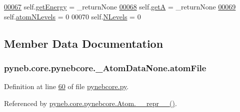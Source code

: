 \begin{DoxyCode}
\hypertarget{classpyneb_1_1core_1_1pynebcore_1_1___atom_data_none_l00067}{}\hyperlink{classpyneb_1_1core_1_1pynebcore_1_1___atom_data_none_a44aa15dc5314c07627944e86581631b1}{00067}         self.\hyperlink{classpyneb_1_1core_1_1pynebcore_1_1___atom_data_none_ace59c545d211f79753ebdc9414eb1824}{getEnergy} = \_returnNone
\hypertarget{classpyneb_1_1core_1_1pynebcore_1_1___atom_data_none_l00068}{}\hyperlink{classpyneb_1_1core_1_1pynebcore_1_1___atom_data_none_a3bc65b4742319ce5123d6fd3ca977c63}{00068}         self.\hyperlink{classpyneb_1_1core_1_1pynebcore_1_1___atom_data_none_a44aa15dc5314c07627944e86581631b1}{getA} = \_returnNone
\hypertarget{classpyneb_1_1core_1_1pynebcore_1_1___atom_data_none_l00069}{}\hyperlink{classpyneb_1_1core_1_1pynebcore_1_1___atom_data_none_a784a8906a9fd1b408b567989207aca84}{00069}         self.\hyperlink{classpyneb_1_1core_1_1pynebcore_1_1___atom_data_none_a3bc65b4742319ce5123d6fd3ca977c63}{atomNLevels} = 0
00070         self.\hyperlink{classpyneb_1_1core_1_1pynebcore_1_1___atom_data_none_a784a8906a9fd1b408b567989207aca84}{NLevels} = 0

\end{DoxyCode}


\subsection{Member Data Documentation}
\hypertarget{classpyneb_1_1core_1_1pynebcore_1_1___atom_data_none_a0b4acd0c49278c6b3ac0fa460ad33bb9}{
\subsubsection[{atom\-File}]{\setlength{\rightskip}{0pt plus 5cm}pyneb.\-core.\-pynebcore.\-\_\-\-Atom\-Data\-None.\-atom\-File}}\label{classpyneb_1_1core_1_1pynebcore_1_1___atom_data_none_a0b4acd0c49278c6b3ac0fa460ad33bb9}


Definition at line \hyperlink{pynebcore_8py_source_l00060}{60} of file \hyperlink{pynebcore_8py_source}{pynebcore.\-py}.



Referenced by \hyperlink{pynebcore_8py_source_l02615}{pyneb.\-core.\-pynebcore.\-Atom.\-\_\-\-\_\-repr\-\_\-\-\_\-()}.


